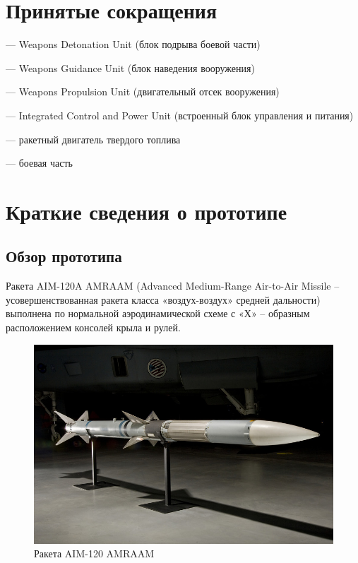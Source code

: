 \documentclass[a4paper,12pt]{report}
\begin{document}
\newpage
\chapter*{Принятые сокращения}
\begin{description}[font=\normalfont\itshape] %
\item[WDU] — Weapons Detonation Unit (блок подрыва боевой части)
\item[WGU] — Weapons Guidance Unit (блок наведения вооружения)
\item[WPU] — Weapons Propulsion Unit (двигательный отсек вооружения)
\item[ICPU] — Integrated Control and Power Unit (встроенный блок управления и питания)
\item[РДТТ] — ракетный двигатель твердого топлива
\item[БЧ] — боевая часть
\end{description}


\newpage
\chapter{Краткие сведения о прототипе}
\section{Обзор прототипа}
Ракета AIM-120A AMRAAM (Advanced Medium-Range Air-to-Air Missile –усовершенствованная ракета класса «воздух-воздух»  средней дальности) выполнена по нормальной аэродинамической схеме с «Х» – образным расположением консолей крыла и рулей.

\begin{figure}[h!]
\centering
\includegraphics[width=0.7\textheight]{images/1.jpg}
\caption{Ракета AIM-120 AMRAAM}
\label{AIM-120}
\end{figure}
\end{document}
